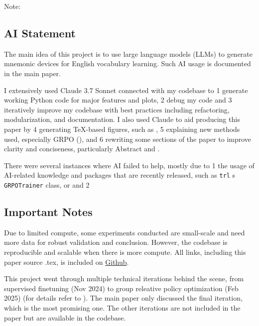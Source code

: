 Note:

\subsection*{AI Statement} \label{sec:ai-statement}

The main idea of this project is to use large language models (LLMs) to generate mnemonic devices for English vocabulary learning. Such AI usage is documented in the main paper.

I extensively used Claude 3.7 Sonnet connected with my codebase to \numlist{1} generate working Python code for major features and plots, \numlist{2} debug my code and \numlist{3} iteratively improve my codebase with best practices including refactoring, modularization, and documentation. I also used Claude to aid producing this paper by \numlist{4} generating TeX-based figures, such as , \numlist{5} explaining new methods used, especially GRPO (), and \numlist{6} rewriting some sections of the paper to improve clarity and conciseness, particularly Abstract and .

There were several instances where AI failed to help, mostly due to \numlist{1} the usage of AI-related knowledge and packages that are recently released, such as \verb|trl|
s \verb|GRPOTrainer| class, or and \numlist{2}


\subsection*{Important Notes} \label{sec:important-notes}

Due to limited compute, some experiments conducted are small-scale and need more data for robust validation and conclusion. However, the codebase is reproducible and scalable when there is more compute. All links, including this paper source .tex, is included on \hyperlink{https://github.com/chiffonng/mnemonic-gen}{Github}.

This project went through multiple technical iterations behind the scene, from supervised finetuning (Nov 2024) to group releative policy optimization (Feb 2025) (for details refer to ). The main paper only discussed the final iteration, which is the most promising one. The other iterations are not included in the paper but are available in the codebase.
\clearpage

\tableofcontents
